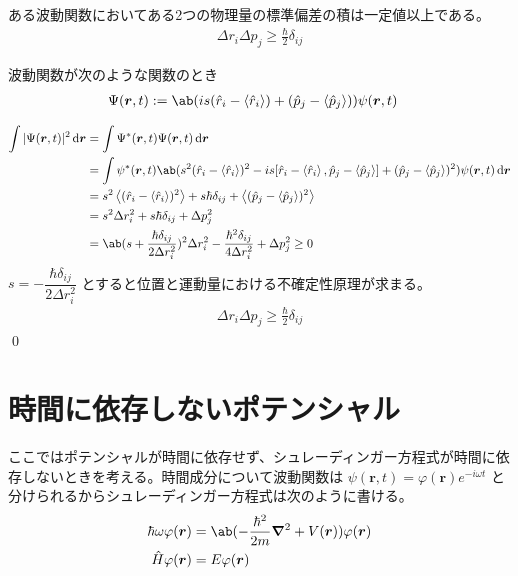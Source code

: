 \documentclass[uplatex,dvipdfmx,a4paper,11pt]{jlreq}
\makeatletter
\newcommand{\rr}{\bm{r}}
\numberwithin{equation}{section}
\theoremstyle{definition}
\renewenvironment{proof}[1][\proofname]{\par
  \normalfont
  \topsep6\p@\@plus6\p@ \trivlist
  \item[\hskip\labelsep{\bfseries #1}\@addpunct{\bfseries}]\ignorespaces\quad\par
}{%
  \qed\endtrivlist\@endpefalse
}
\renewcommand\proofname{証明}
\makeatother
\begin{document}
\begin{theorem}[不確定性原理]
  ある波動関数においてある2つの物理量の標準偏差の積は一定値以上である。
  \begin{align}
    \Delta r_i\Delta p_j \geq \frac{\hbar}{2}\delta_{ij}
  \end{align}
\end{theorem}
\begin{proof}
  波動関数が次のような関数のとき
  \begin{align}
    \Psi(\rr, t) & := \ab(is(\hat{r}_i - \ev{\hat{r}_i}) + (\hat{p}_j - \ev{\hat{p}_j}))\psi(\rr, t)
  \end{align}

  \begin{align}
    \int|\Psi(\rr, t)|^2\dl{\rr} & = \int\Psi^*(\rr, t)\Psi(\rr, t)\dl{\rr}                                                                                                                                     \\
                                 & = \int\psi^*(\rr, t)\ab(s^2(\hat{r}_i - \ev{\hat{r}_i})^2 - is[\hat{r}_i - \ev{\hat{r}_i}, \hat{p}_j - \ev{\hat{p}_j}] + (\hat{p}_j - \ev{\hat{p}_j})^2)\psi(\rr, t)\dl{\rr} \\
                                 & = s^2\ev{(\hat{r}_i - \ev{\hat{r}_i})^2} + s\hbar\delta_{ij} + \ev{(\hat{p}_j - \ev{\hat{p}_j})^2}                                                                           \\
                                 & = s^2\Delta r_i^2 + s\hbar\delta_{ij} + \Delta p_j^2                                                                                                                         \\
                                 & = \ab(s + \frac{\hbar\delta_{ij}}{2\Delta r_i^2})^2\Delta r_i^2 - \frac{\hbar^2\delta_{ij}}{4\Delta r_i^2} + \Delta p_j^2 \geq 0
  \end{align}
  $s = -\dfrac{\hbar\delta_{ij}}{2\Delta r_i^2}$ とすると位置と運動量における不確定性原理が求まる。
  \begin{align}
    \Delta r_i\Delta p_j \geq \frac{\hbar}{2}\delta_{ij}
  \end{align}
\end{proof}

\section{時間に依存しないポテンシャル}
ここではポテンシャルが時間に依存せず、シュレーディンガー方程式が時間に依存しないときを考える。時間成分について波動関数は $\psi(\rr, t) = \varphi(\rr)e^{-i\omega t}$ と分けられるからシュレーディンガー方程式は次のように書ける。
\begin{align}
  \hbar\omega\varphi(\rr) & = \ab(-\frac{\hbar^2}{2m}\vnabla^2 + V(\rr))\varphi(\rr) \\
  \hat{H}\varphi(\rr)     & = E\varphi(\rr)
\end{align}
\end{document}
